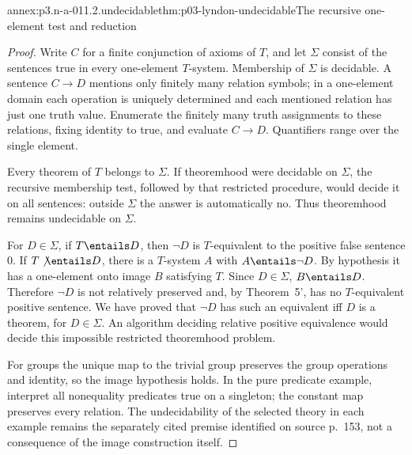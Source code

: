 \begin{annexitem}{annex:p3.n-a-011.2.undecidable}{thm:p03-lyndon-undecidable}{The recursive one-element test and reduction}
\begin{proof}
Write \(C\) for a finite conjunction of axioms of \(T\), and let
\(\Sigma\) consist of the sentences true in every one-element
\(T\)-system. Membership of \(\Sigma\) is decidable. A sentence
\(C\to D\) mentions only finitely many relation symbols; in a
one-element domain each operation is uniquely determined and each
mentioned relation has just one truth value. Enumerate the finitely
many truth assignments to these relations, fixing identity to true,
and evaluate \(C\to D\). Quantifiers range over the single element.

Every theorem of \(T\) belongs to \(\Sigma\). If theoremhood were
decidable on \(\Sigma\), the recursive membership test, followed by
that restricted procedure, would decide it on all sentences: outside
\(\Sigma\) the answer is automatically no. Thus theoremhood remains
undecidable on \(\Sigma\).

For \(D\in\Sigma\), if \(T\entails D\), then \(\neg D\) is
\(T\)-equivalent to the positive false sentence \(0\). If
\(T\not\entails D\), there is a \(T\)-system \(A\) with
\(A\entails\neg D\). By hypothesis it has a one-element onto image
\(B\) satisfying \(T\). Since \(D\in\Sigma\),
\(B\entails D\). Therefore \(\neg D\) is not relatively preserved
and, by Theorem~5', has no \(T\)-equivalent positive sentence. We have
proved that \(\neg D\) has such an equivalent iff \(D\) is a theorem,
for \(D\in\Sigma\). An algorithm deciding relative positive
equivalence would decide this impossible restricted theoremhood problem.

For groups the unique map to the trivial group preserves the group
operations and identity, so the image hypothesis holds. In the pure
predicate example, interpret all nonequality predicates true on a
singleton; the constant map preserves every relation. The undecidability
of the selected theory in each example remains the separately cited
premise identified on source p.~153, not a consequence of the image
construction itself.
\end{proof}
\end{annexitem}

